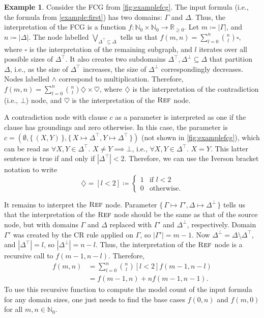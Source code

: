 \documentclass{article}
\theoremstyle{definition}
\newtheorem{example}{Example}
\DeclareMathOperator{\Reff}{\textsc{Ref}}
\begin{document}
\begin{example}\label{example:interpretation}
  Consider the FCG from \cref{fig:examplefcg}. The input formula (i.e., the
  formula from \cref{example:first}) has two domains: $\Gamma$ and $\Delta$.
  Thus, the interpretation of the FCG is a function
  $f\colon \mathbb{N}_{0} \times \mathbb{N}_{0} \to \mathbb{R}_{\ge 0}$. Let
  $m \coloneqq |\Gamma|$, and $n \coloneqq |\Delta|$. The node labelled
  $\bigvee_{\Delta^{\top} \subseteq \Delta}$ tells us that
  $f(m, n) = \sum_{l = 0}^{n} \binom{n}{l} \square$, where $\square$ is the
  interpretation of the remaining subgraph, and $l$ iterates over all possible
  sizes of $\Delta^{\top}$. It also creates two subdomains
  $\Delta^{\top}, \Delta^{\bot} \subseteq \Delta$ that partition $\Delta$, i.e.,
  as the size of $\Delta^{\top}$ increases, the size of $\Delta^{\bot}$
  correspondingly decreases. Nodes labelled $\land$ correspond to
  multiplication. Therefore,
  $f(m, n) = \sum_{l = 0}^{n} \binom{n}{l} \diamondsuit \times \heartsuit$,
  where $\diamondsuit$ is the interpretation of the contradiction (i.e., $\bot$)
  node, and $\heartsuit$ is the interpretation of the $\Reff$ node.

  A contradiction node with clause $c$ as a parameter is interpreted as one if
  the clause has groundings and zero otherwise. In this case, the parameter is
  $c = (\emptyset, \{\, (X, Y) \,\}, \{\, X \mapsto \Delta^\top, Y \mapsto \Delta^\top \,\})$
  (not shown in \cref{fig:examplefcg}), which can be read as
  $\forall X, Y \in \Delta^{\top}\text{. }X \ne Y \implies \bot$, i.e.,
  $\forall X, Y \in \Delta^{\top}\text{. }X = Y$. This latter sentence is true
  if and only if $|\Delta^{\top}| < 2$. Therefore, we can use the Iverson
  bracket notation to write
  \[
    \diamondsuit = [l < 2] \coloneqq
    \begin{cases}
      1 & \text{if } l < 2 \\
      0 & \text{otherwise.}
    \end{cases}
  \]

  It remains to interpret the $\Reff$ node. Parameter
  $\{\, \Gamma \mapsto \Gamma', \Delta \mapsto \Delta^\bot \,\}$ tells us that
  the interpretation of the $\Reff$ node should be the same as that of the
  source node, but with domains $\Gamma$ and $\Delta$ replaced with $\Gamma'$
  and $\Delta^{\bot}$, respectively. Domain $\Gamma'$ was created by the CR rule
  applied on $\Gamma$, so $|\Gamma'| = m - 1$. Now
  $\Delta^{\bot} = \Delta \setminus \Delta^{\top}$, and $|\Delta^{\top}| = l$,
  so $|\Delta^{\bot}| = n - l$. Thus, the interpretation of the $\Reff$ node is
  a recursive call to $f(m - 1, n - l)$. Therefore,
  \begin{align}
    f(m, n) &= \sum_{l = 0}^{n} \binom{n}{l} [l < 2] f(m-1, n-l)\nonumber \\
            &= f(m-1, n) + n f(m-1, n-1).\label{eq:solution}
  \end{align}
  To use this recursive function to compute the model count of the input formula
  for any domain sizes, one just needs to find the base cases $f(0, n)$ and
  $f(m, 0)$ for all $m, n \in \mathbb{N}_{0}$.
\end{example}
\end{document}
